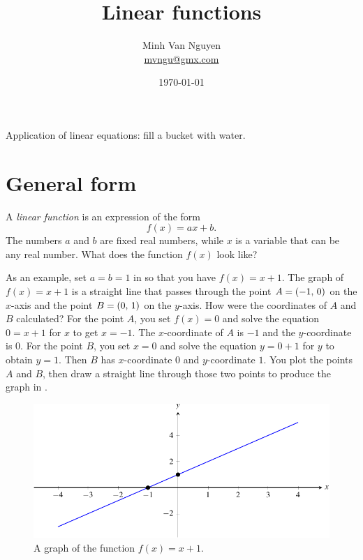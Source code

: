 \documentclass[a4paper,oneside,12pt]{article}
\begin{document}
\title{\Large\bf Linear functions}
\author{%
  Minh Van Nguyen \\
  \url{mvngu@gmx.com}
}
\date{\today}
\maketitle

\begin{packeditem}
\item Application of linear equations: fill a bucket with water.
\end{packeditem}


\section{General form}
\label{sec:general_form}

A \emph{linear function} is an expression of the form
\begin{equation}
\label{eqn:linear_function_general}
f(x)
=
ax + b.
\end{equation}
The numbers $a$ and $b$ are fixed real numbers, while $x$ is a
variable that can be any real number.  What does the function $f(x)$
look like?

As an example, set $a = b = 1$ in
 so that you have
$f(x) = x + 1$.  The graph of $f(x) = x + 1$ is a straight line that
passes through the point $A = \left\lparen{-1},\, {0}\right\rparen$ on the $x$-axis and the
point $B = \left\lparen{0},\, {1}\right\rparen$ on the $y$-axis.  How were the coordinates of
$A$ and $B$ calculated?  For the point $A$, you set $f(x) = 0$ and
solve the equation $0 = x + 1$ for $x$ to get $x = -1$.  The
$x$-coordinate of $A$ is $-1$ and the $y$-coordinate is $0$.  For the
point $B$, you set $x = 0$ and solve the equation $y = 0 + 1$ for $y$
to obtain $y = 1$.  Then $B$ has $x$-coordinate $0$ and $y$-coordinate
$1$.  You plot the points $A$ and $B$, then draw a straight line
through those two points to produce the graph in
.

\begin{figure}[!htbp]
\centering
\includegraphics[scale=1]{image/06/a-1-b-1.pdf}
\caption{%
  A graph of the function $f(x) = x + 1$.
}
\label{fig:plot_x_+_1}
\end{figure}
\end{document}
